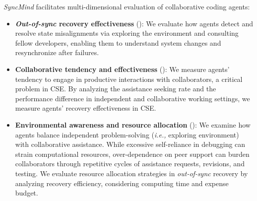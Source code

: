 \textit{SyncMind} facilitates multi-dimensional evaluation of collaborative coding agents: 
\begin{itemize}[noitemsep,topsep=0pt,parsep=2pt,partopsep=0pt,leftmargin=*]
\vspace{-5pt}

\item \textbf{\textit{Out-of-sync} recovery effectiveness} (): We evaluate how agents detect and resolve state misalignments via exploring the environment and consulting fellow developers, enabling them to understand system changes and resynchronize after failures. 



\item \textbf{Collaborative tendency and effectiveness} (): We measure agents' tendency to engage in productive interactions with collaborators, a critical problem in CSE. 
% 
By analyzing the assistance seeking rate and the performance difference in independent and collaborative working settings, we measure agents' recovery effectiveness in CSE. 

\item \textbf{Environmental awareness and resource allocation} (): 
We examine how agents balance independent problem-solving (\textit{i.e.,} exploring environment) with collaborative assistance. 
While excessive self-reliance in debugging can strain computational resources, over-dependence on peer support can burden collaborators through repetitive cycles of assistance requests, revisions, and testing. 
We evaluate resource allocation strategies in \textit{out-of-sync} recovery by analyzing recovery efficiency, considering computing time and expense budget.




% 

 
\end{itemize}


